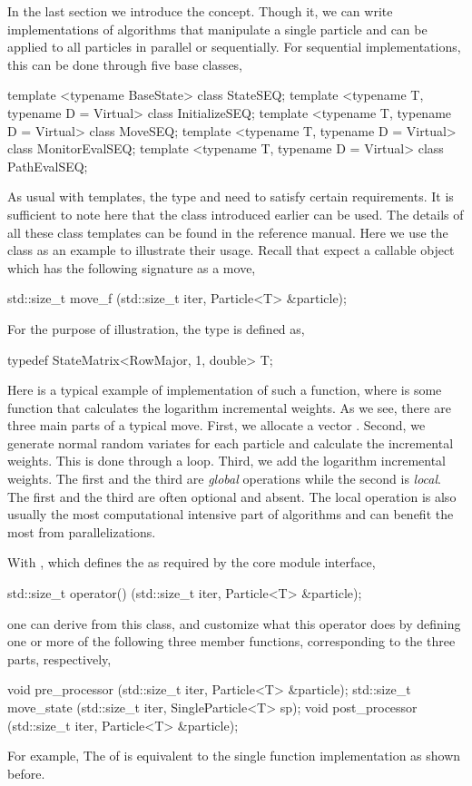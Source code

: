 In the last section we introduce the  concept.
Though it, we can write implementations of \smc algorithms that manipulate a
single particle and can be applied to all particles in parallel or
sequentially. For sequential implementations, this can be done through five
base classes,
\begin{cppcode}
template <typename BaseState> class StateSEQ;
template <typename T, typename D = Virtual> class InitializeSEQ;
template <typename T, typename D = Virtual> class MoveSEQ;
template <typename T, typename D = Virtual> class MonitorEvalSEQ;
template <typename T, typename D = Virtual> class PathEvalSEQ;
\end{cppcode}
As usual with templates, the type  and  need
to satisfy certain requirements. It is sufficient to note here that the
 class introduced earlier can be used. The details of
all these class templates can be found in the reference manual.  Here we use
the  class as an example to illustrate their usage.
Recall that  expect a callable object which has the
following signature as a move,
\begin{cppcode}
std::size_t move_f (std::size_t iter, Particle<T> &particle);
\end{cppcode}
For the purpose of illustration, the type  is defined as,
\begin{cppcode}
typedef StateMatrix<RowMajor, 1, double> T;
\end{cppcode}
Here is a typical example of implementation of such a function,
where  is some function that calculates the
logarithm incremental weights. As we see, there are three main parts of a
typical move. First, we allocate a vector . Second, we
generate normal random variates for each particle and calculate the
incremental weights. This is done through a  loop. Third, we
add the logarithm incremental weights. The first and the third are
\emph{global} operations while the second is \emph{local}. The first and the
third are often optional and absent. The local operation is also usually the
most computational intensive part of \smc algorithms and can benefit the most
from parallelizations.

With , which defines the  as
required by the core module interface,
\begin{cppcode}
std::size_t operator() (std::size_t iter, Particle<T> &particle);
\end{cppcode}
one can derive from this class, and customize what this operator does by
defining one or more of the following three member functions, corresponding to
the three parts, respectively,
\begin{cppcode}
void pre_processor (std::size_t iter, Particle<T> &particle);
std::size_t move_state (std::size_t iter, SingleParticle<T> sp);
void post_processor (std::size_t iter, Particle<T> &particle);
\end{cppcode}
For example,
The  of  is equivalent to the
single function implementation as shown before.

